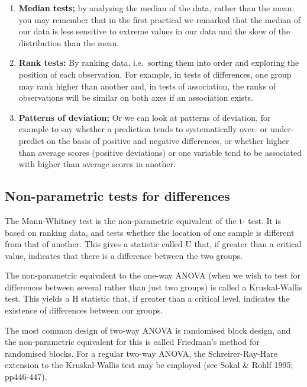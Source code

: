 \documentclass[
]{book}
\providecommand{\tightlist}{%
  \setlength{\itemsep}{0pt}\setlength{\parskip}{0pt}}
\begin{document}
\begin{enumerate}
\def\labelenumi{\arabic{enumi})}
\tightlist
\item
  \textbf{Median tests;} by analysing the median of the data, rather than the mean: you may remember that in the first practical we remarked that the median of our data is less sensitive to extreme values in our data and the skew of the distribution than the mean.
\item
  \textbf{Rank tests:} By ranking data, i.e.~sorting them into order and exploring the position of each observation. For example, in tests of differences, one group may rank higher than another and, in tests of association, the ranks of observations will be similar on both axes if an association exists.
\item
  \textbf{Patterns of deviation;} Or we can look at patterns of deviation, for example to say whether a prediction tends to systematically over- or under- predict on the basis of positive and negative differences, or whether higher than average scores (positive deviations) or one variable tend to be associated with higher than average scores in another.
\end{enumerate}

\subsection*{Non-parametric tests for differences}\label{non-parametric-tests-for-differences}

The Mann-Whitney test is the non-parametric equivalent of the t- test. It is based on ranking data, and tests whether the location of one sample is different from that of another. This gives a statistic called U that, if greater than a critical value, indicates that there is a difference between the two groups.

The non-parametric equivalent to the one-way ANOVA (when we wish to test for differences between several rather than just two groups) is called a Kruskal-Wallis test. This yields a H statistic that, if greater than a critical level, indicates the existence of differences between our groups.

The most common design of two-way ANOVA is randomised block design, and the non-parametric equivalent for this is called Friedman's method for randomised blocks. For a regular two-way ANOVA, the Schreirer-Ray-Hare extension to the Kruskal-Wallis test may be employed (see Sokal \& Rohlf 1995; pp446-447).
\end{document}
